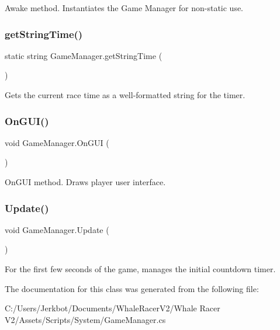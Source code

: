 Awake method. Instantiates the Game Manager for non-\/static use. 

\mbox{\label{class_game_manager_a3e3ec00ea59fb39386ddd3f1d5bdcd6a}} 
\subsubsection{\texorpdfstring{get\+String\+Time()}{getStringTime()}}
{\footnotesize\ttfamily static string Game\+Manager.\+get\+String\+Time (\begin{DoxyParamCaption}{ }\end{DoxyParamCaption})\hspace{0.3cm}{\ttfamily [static]}}



Gets the current race time as a well-\/formatted string for the timer. 

\mbox{\label{class_game_manager_a5186f9551988478435e66f7bb71e8898}} 
\subsubsection{\texorpdfstring{On\+G\+U\+I()}{OnGUI()}}
{\footnotesize\ttfamily void Game\+Manager.\+On\+G\+UI (\begin{DoxyParamCaption}{ }\end{DoxyParamCaption})\hspace{0.3cm}{\ttfamily [private]}}



On\+G\+UI method. Draws player user interface. 

\mbox{\label{class_game_manager_a44c79b205dec16bfe650e21259860c5b}} 
\subsubsection{\texorpdfstring{Update()}{Update()}}
{\footnotesize\ttfamily void Game\+Manager.\+Update (\begin{DoxyParamCaption}{ }\end{DoxyParamCaption})\hspace{0.3cm}{\ttfamily [private]}}



For the first few seconds of the game, manages the initial countdown timer. 



The documentation for this class was generated from the following file\+:\begin{DoxyCompactItemize}
\item 
C\+:/\+Users/\+Jerkbot/\+Documents/\+Whale\+Racer\+V2/\+Whale Racer V2/\+Assets/\+Scripts/\+System/Game\+Manager.\+cs\end{DoxyCompactItemize}
